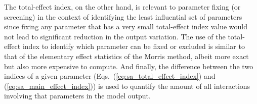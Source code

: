 The total-effect index, on the other hand, is relevant to parameter fixing (or screening) in the context of identifying the least influential set of parameters since fixing any parameter that has a very small 
total-effect index value would not lead to significant reduction in the output variation.
The use of the total-effect index to identify which parameter can be fixed or excluded is similar to that of the elementary effect statistics of the Morris method, 
albeit more exact but also more expensive to compute.
And finally, the difference between the two indices of a given parameter (Eqs.~(\ref{eq:sa_total_effect_index}) and (\ref{eq:sa_main_effect_index})) is used to quantify the amount of all interactions involving that parameters in the model output.
